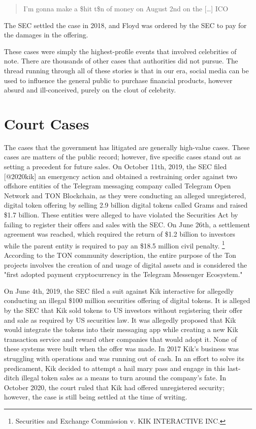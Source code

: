 
\begin{quote}
I'm gonna make a \$hit t\$n of money on August 2nd on the {[}\ldots{]}
ICO
\end{quote}

The SEC settled the case in 2018, and Floyd was ordered by the SEC to pay for
the damages in the offering.

These cases were simply the highest-profile events that involved celebrities of
note. There are thousands of other cases that authorities did not pursue. The
thread running through all of these stories is that in our era, social media can
be used to influence the general public to purchase financial products, however
absurd and ill-conceived, purely on the clout of celebrity.

\section{Court Cases}

The cases that the government has litigated are generally high-value cases.
These cases are matters of the public record; however, five specific cases stand
out as setting a precedent for future sales. On October 11th, 2019, the SEC
filed [@2020kik] an emergency action and obtained a restraining order against
two offshore entities of the Telegram messaging company called Telegram Open
Network and TON Blockchain, as they were conducting an alleged unregistered,
digital token offering by selling 2.9 billion digital tokens called Grams and
raised \$1.7 billion. These entities were alleged to have violated the
Securities Act by failing to register their offers and sales with the SEC. On
June 26th, a settlement agreement was reached, which required the return of
\$1.2 billion to investors while the parent entity is required to pay an \$18.5
million civil penalty. \footnote{Securities and Exchange Commission v. KIK
INTERACTIVE INC.} According to the TON community description, the entire purpose of the Ton projects involves the creation of and usage of digital assets and is considered the "first adopted payment cryptocurrency in the Telegram Messenger Ecosystem."


On June 4th, 2019, the SEC filed a suit against Kik interactive for allegedly
conducting an illegal \$100 million securities offering of digital tokens. It is
alleged by the SEC that Kik sold tokens to US investors without registering
their offer and sale as required by US securities law. It was allegedly proposed
that Kik would integrate the tokens into their messaging app while creating a
new Kik transaction service and reward other companies that would adopt it. None
of these systems were built when the offer was made. In 2017 Kik's business was
struggling with operations and was running out of cash. In an effort to solve
its predicament, Kik decided to attempt a hail mary pass and engage in this
last-ditch illegal token sales as a means to turn around the company's fate. In
October 2020, the court ruled that Kik had offered unregistered security;
however, the case is still being settled at the time of writing.

